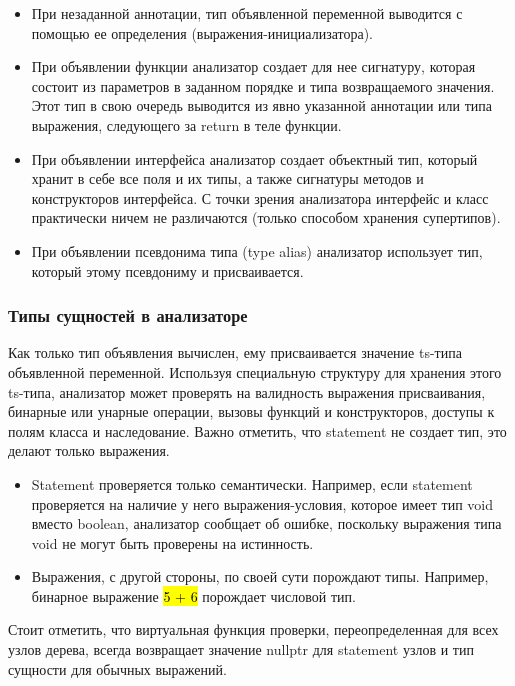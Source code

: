 \begin{itemize}[left=2em]
    \item При незаданной аннотации, тип объявленной переменной выводится с помощью ее определения (выражения-инициализатора).
    \item При объявлении функции анализатор создает для нее сигнатуру, которая состоит из параметров в заданном порядке
    и типа возвращаемого значения.
    Этот тип в свою очередь выводится из явно указанной аннотации или типа выражения, следующего за return в теле функции.
    \item При объявлении интерфейса анализатор создает объектный тип, который хранит в себе все поля и их типы, а также
    сигнатуры методов и конструкторов интерфейса.
    С точки зрения анализатора интерфейс и класс практически ничем не различаются (только способом хранения супертипов).
    \item При объявлении псевдонима типа (type alias) анализатор использует тип, который этому псевдониму и присваивается.
\end{itemize}

\subsubsection{Типы сущностей в анализаторе}

Как только тип объявления вычислен, ему присваивается значение ts-типа объявленной переменной.
Используя специальную структуру для хранения этого ts-типа, анализатор может проверять на валидность выражения
присваивания, бинарные или унарные операции, вызовы функций и конструкторов, доступы к полям класса и наследование.
Важно отметить, что statement не создает тип, это делают только выражения.

\begin{itemize}[left=2em]
    \item Statement проверяется только семантически.
    Например, если statement проверяется на наличие у него выражения-условия,
    которое имеет тип void вместо boolean, анализатор сообщает об ошибке, поскольку выражения типа void не могут быть
    проверены на истинность.
    \item Выражения, с другой стороны, по своей сути порождают типы.
    Например, бинарное выражение \hl{5 + 6} порождает числовой тип.
\end{itemize}

Стоит отметить, что виртуальная функция проверки, переопределенная для всех узлов дерева, всегда возвращает
значение nullptr для statement узлов и тип сущности для обычных выражений.

